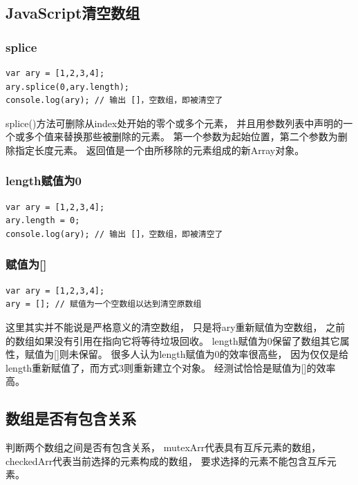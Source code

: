 \documentclass{book}
\begin{document}
\subsection{JavaScript清空数组}

\subsubsection{splice}

\begin{lstlisting}[language=VBScript]
var ary = [1,2,3,4];
ary.splice(0,ary.length);
console.log(ary); // 输出 []，空数组，即被清空了
\end{lstlisting}

splice()方法可删除从index处开始的零个或多个元素，
并且用参数列表中声明的一个或多个值来替换那些被删除的元素。
第一个参数为起始位置，第二个参数为删除指定长度元素。
返回值是一个由所移除的元素组成的新Array对象。

\subsubsection{length赋值为0}

\begin{lstlisting}[language=VBScript]
var ary = [1,2,3,4];
ary.length = 0;
console.log(ary); // 输出 []，空数组，即被清空了
\end{lstlisting}


\subsubsection{赋值为[]}

\begin{lstlisting}[language=VBScript]
var ary = [1,2,3,4];
ary = []; // 赋值为一个空数组以达到清空原数组
\end{lstlisting}

这里其实并不能说是严格意义的清空数组，
只是将ary重新赋值为空数组，
之前的数组如果没有引用在指向它将等待垃圾回收。
length赋值为0保留了数组其它属性，赋值为[]则未保留。
很多人认为length赋值为0的效率很高些，
因为仅仅是给length重新赋值了，而方式3则重新建立个对象。
经测试恰恰是赋值为[]的效率高。

\subsection{数组是否有包含关系}

判断两个数组之间是否有包含关系，
mutexArr代表具有互斥元素的数组，
checkedArr代表当前选择的元素构成的数组，
要求选择的元素不能包含互斥元素。
\end{document}
